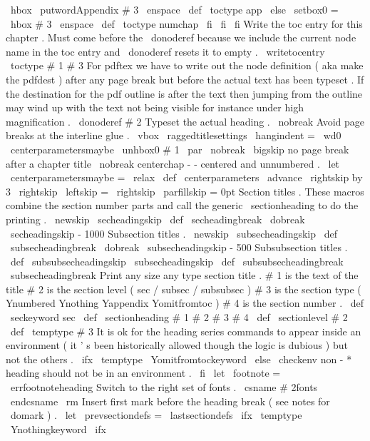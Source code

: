 {{{{{\
hbox
{
\
putwordAppendix
{
}
#
3
\
enspace
}
%
\
def
\
toctype
{
app
}
%
\
else
\
setbox0
=
\
hbox
{
#
3
\
enspace
}
%
\
def
\
toctype
{
numchap
}
%
\
fi
\
fi
\
fi
%
%
Write
the
toc
entry
for
this
chapter
.
Must
come
before
the
%
\
donoderef
because
we
include
the
current
node
name
in
the
toc
%
entry
and
\
donoderef
resets
it
to
empty
.
\
writetocentry
{
\
toctype
}
{
#
1
}
{
#
3
}
%
%
%
For
pdftex
we
have
to
write
out
the
node
definition
(
aka
make
%
the
pdfdest
)
after
any
page
break
but
before
the
actual
text
has
%
been
typeset
.
If
the
destination
for
the
pdf
outline
is
after
the
%
text
then
jumping
from
the
outline
may
wind
up
with
the
text
not
%
being
visible
for
instance
under
high
magnification
.
\
donoderef
{
#
2
}
%
%
%
Typeset
the
actual
heading
.
\
nobreak
%
Avoid
page
breaks
at
the
interline
glue
.
\
vbox
{
\
raggedtitlesettings
\
hangindent
=
\
wd0
\
centerparametersmaybe
\
unhbox0
#
1
\
par
}
%
}
%
\
nobreak
\
bigskip
%
no
page
break
after
a
chapter
title
\
nobreak
}
%
centerchap
-
-
centered
and
unnumbered
.
\
let
\
centerparametersmaybe
=
\
relax
\
def
\
centerparameters
{
%
\
advance
\
rightskip
by
3
\
rightskip
\
leftskip
=
\
rightskip
\
parfillskip
=
0pt
}
%
Section
titles
.
These
macros
combine
the
section
number
parts
and
%
call
the
generic
\
sectionheading
to
do
the
printing
.
%
\
newskip
\
secheadingskip
\
def
\
secheadingbreak
{
\
dobreak
\
secheadingskip
{
-
1000
}
}
%
Subsection
titles
.
\
newskip
\
subsecheadingskip
\
def
\
subsecheadingbreak
{
\
dobreak
\
subsecheadingskip
{
-
500
}
}
%
Subsubsection
titles
.
\
def
\
subsubsecheadingskip
{
\
subsecheadingskip
}
\
def
\
subsubsecheadingbreak
{
\
subsecheadingbreak
}
%
Print
any
size
any
type
section
title
.
%
%
#
1
is
the
text
of
the
title
%
#
2
is
the
section
level
(
sec
/
subsec
/
subsubsec
)
%
#
3
is
the
section
type
(
Ynumbered
Ynothing
Yappendix
Yomitfromtoc
)
%
#
4
is
the
section
number
.
%
\
def
\
seckeyword
{
sec
}
%
\
def
\
sectionheading
#
1
#
2
#
3
#
4
{
%
{
%
\
def
\
sectionlevel
{
#
2
}
%
\
def
\
temptype
{
#
3
}
%
%
%
It
is
ok
for
the
heading
series
commands
to
appear
inside
an
%
environment
(
it
'
s
been
historically
allowed
though
the
logic
is
%
dubious
)
but
not
the
others
.
\
ifx
\
temptype
\
Yomitfromtockeyword
\
else
\
checkenv
{
}
%
non
-
*
heading
should
not
be
in
an
environment
.
\
fi
\
let
\
footnote
=
\
errfootnoteheading
%
%
Switch
to
the
right
set
of
fonts
.
\
csname
#
2fonts
\
endcsname
\
rm
%
%
Insert
first
mark
before
the
heading
break
(
see
notes
for
\
domark
)
.
\
let
\
prevsectiondefs
=
\
lastsectiondefs
\
ifx
\
temptype
\
Ynothingkeyword
\
ifx
}}}}}
